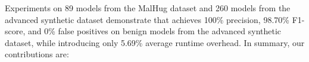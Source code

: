 
Experiments on 89 models from the MalHug dataset and 260 models from the advanced synthetic dataset demonstrate that \toolname{} achieves 100\% precision, 98.70\% F1-score, and 0\% false positives on benign models from the advanced synthetic dataset, while introducing only 5.69\% average runtime overhead. In summary, our contributions are:
  
